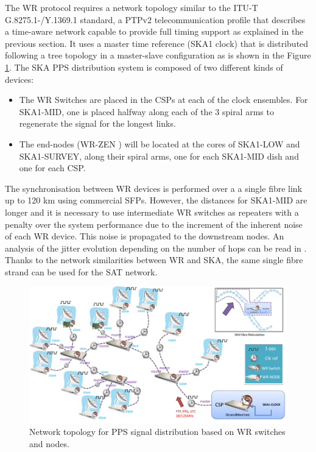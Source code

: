 The WR protocol requires a network topology similar to the ITU-T 
G.8275.1-\allowbreak /Y.1369.1 standard, a PTPv2 telecommunication profile that
describes a time-aware network capable to provide full timing support
\cite{itu:TG8275_1_Y_1369_1} as explained in the previous section. It uses a master time reference (SKA1 clock) that is distributed following a tree topology in a master-slave configuration as is shown in the Figure \ref{fig:ska_pps_dist_network}. The SKA PPS distribution system is composed of two different kinds of devices:

\begin{itemize} 
	\item {The WR Switches \cite{sevensols:wr_switch} are placed in the CSPs at each of the clock ensembles. For SKA1-MID, one is placed halfway along each of the 3 spiral arms to regenerate the signal for the longest links.} \item{The end-nodes (WR-ZEN \cite{sevensols:wr_zen}) will be located at the cores of SKA1-LOW and SKA1-SURVEY, along their spiral arms, one for each SKA1-MID dish and one for each CSP.} 
\end{itemize}

The synchronisation between WR devices is performed over a a single fibre link up
to 120 km using commercial SFPs.  However, the distances for SKA1-MID are
longer and it is necessary to use intermediate WR switches as repeaters with a
penalty over the system performance due to the increment of the inherent noise of
each WR device. This noise is propagated to the downstream nodes. An analysis of
the jitter evolution depending on the number of hops can be read in
\cite{torres2016scalability}. Thanks to the network similarities between WR and
SKA, the same single fibre strand can be used for the SAT network. 

\begin{figure}[H] \centering \includegraphics[scale=0.4]{img/ska_pps_network}
\caption{Network topology for PPS signal distribution based on WR switches and
nodes. }
\label{fig:ska_pps_dist_network} \end{figure}

